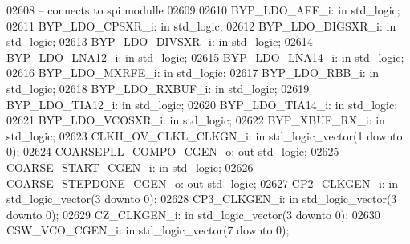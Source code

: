 \begin{DoxyCode}
02608 \textcolor{keyword}{    -- connects to spi modulle}
02609     
02610     BYP\_LDO\_AFE\_i:  \textcolor{keywordflow}{in} \textcolor{comment}{std\_logic};
02611     BYP\_LDO\_CPSXR\_i:    \textcolor{keywordflow}{in} \textcolor{comment}{std\_logic};
02612     BYP\_LDO\_DIGSXR\_i:   \textcolor{keywordflow}{in} \textcolor{comment}{std\_logic};
02613     BYP\_LDO\_DIVSXR\_i:   \textcolor{keywordflow}{in} \textcolor{comment}{std\_logic};
02614     BYP\_LDO\_LNA12\_i:    \textcolor{keywordflow}{in} \textcolor{comment}{std\_logic};
02615     BYP\_LDO\_LNA14\_i:    \textcolor{keywordflow}{in} \textcolor{comment}{std\_logic};
02616     BYP\_LDO\_MXRFE\_i:    \textcolor{keywordflow}{in} \textcolor{comment}{std\_logic};
02617     BYP\_LDO\_RBB\_i:  \textcolor{keywordflow}{in} \textcolor{comment}{std\_logic};
02618     BYP\_LDO\_RXBUF\_i:    \textcolor{keywordflow}{in} \textcolor{comment}{std\_logic};
02619     BYP\_LDO\_TIA12\_i:    \textcolor{keywordflow}{in} \textcolor{comment}{std\_logic};
02620     BYP\_LDO\_TIA14\_i:    \textcolor{keywordflow}{in} \textcolor{comment}{std\_logic};
02621     BYP\_LDO\_VCOSXR\_i:   \textcolor{keywordflow}{in} \textcolor{comment}{std\_logic};
02622     BYP\_XBUF\_RX\_i:  \textcolor{keywordflow}{in} \textcolor{comment}{std\_logic};
02623     CLKH\_OV\_CLKL\_CLKGN\_i:   \textcolor{keywordflow}{in} \textcolor{comment}{std\_logic\_vector}(\textcolor{vhdllogic}{}\textcolor{vhdllogic}{1} \textcolor{keywordflow}{downto} \textcolor{vhdllogic}{}\textcolor{vhdllogic}{0});
02624     COARSEPLL\_COMPO\_CGEN\_o: \textcolor{keywordflow}{out} \textcolor{comment}{std\_logic};
02625     COARSE\_START\_CGEN\_i:    \textcolor{keywordflow}{in} \textcolor{comment}{std\_logic};
02626     COARSE\_STEPDONE\_CGEN\_o: \textcolor{keywordflow}{out} \textcolor{comment}{std\_logic};
02627     CP2\_CLKGEN\_i:   \textcolor{keywordflow}{in} \textcolor{comment}{std\_logic\_vector}(\textcolor{vhdllogic}{}\textcolor{vhdllogic}{3} \textcolor{keywordflow}{downto} \textcolor{vhdllogic}{}\textcolor{vhdllogic}{0});
02628     CP3\_CLKGEN\_i:   \textcolor{keywordflow}{in} \textcolor{comment}{std\_logic\_vector}(\textcolor{vhdllogic}{}\textcolor{vhdllogic}{3} \textcolor{keywordflow}{downto} \textcolor{vhdllogic}{}\textcolor{vhdllogic}{0});
02629     CZ\_CLKGEN\_i:    \textcolor{keywordflow}{in} \textcolor{comment}{std\_logic\_vector}(\textcolor{vhdllogic}{}\textcolor{vhdllogic}{3} \textcolor{keywordflow}{downto} \textcolor{vhdllogic}{}\textcolor{vhdllogic}{0});
02630     CSW\_VCO\_CGEN\_i: \textcolor{keywordflow}{in} \textcolor{comment}{std\_logic\_vector}(\textcolor{vhdllogic}{}\textcolor{vhdllogic}{7} \textcolor{keywordflow}{downto} \textcolor{vhdllogic}{}\textcolor{vhdllogic}{0});

\end{DoxyCode}
